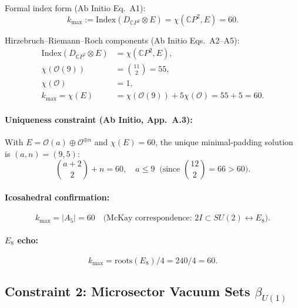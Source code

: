 \documentclass[11pt]{article}
\begin{document}
Formal index form (Ab Initio Eq.~A1):
\begin{equation}\tag{BL-2}
k_{\max} := \mathrm{Index}(D_{\mathbb{C}P^2} \otimes E) = \chi(\mathbb{C}P^2, E) = 60.
\end{equation}

Hirzebruch--Riemann--Roch components (Ab Initio Eqs.~A2--A5):
\begin{align}
\mathrm{Index}(D_{\mathbb{C}P^2} \otimes E) &= \chi(\mathbb{C}P^2, E), \tag{BL-3} \\
\chi(\mathcal{O}(9)) &= \binom{11}{2} = 55, \tag{BL-4} \\
\chi(\mathcal{O}) &= 1, \tag{BL-5} \\
k_{\max} = \chi(E) &= \chi(\mathcal{O}(9)) + 5\chi(\mathcal{O}) = 55 + 5 = 60. \tag{BL-6}
\end{align}

\paragraph{Uniqueness constraint (Ab Initio, App.~A.3):}
With $E = \mathcal{O}(a) \oplus \mathcal{O}^{\oplus n}$ and $\chi(E) = 60$, the unique
minimal-padding solution is $(a,n) = (9,5)$:
\begin{equation}\tag{BL-7}
\binom{a+2}{2} + n = 60, \quad a \leq 9 \;\;\text{(since } \binom{12}{2} = 66 > 60\text{)}.
\end{equation}

\paragraph{Icosahedral confirmation:}
\begin{equation}\tag{BL-8}
k_{\max} = |A_5| = 60 \quad \text{(McKay correspondence: } 2I \subset SU(2) \leftrightarrow E_8\text{)}.
\end{equation}

\paragraph{$E_8$ echo:}
\begin{equation}\tag{BL-9}
k_{\max} = \mathrm{roots}(E_8)/4 = 240/4 = 60.
\end{equation}

\subsection{Constraint 2: Microsector Vacuum Sets $\beta_{U(1)}$}
\end{document}
